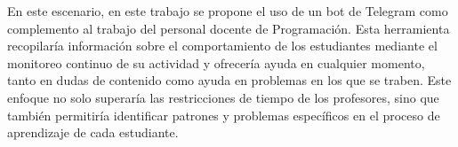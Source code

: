 \documentclass{article}
\begin{document}


En este escenario, en este trabajo se propone el uso de un bot de Telegram como complemento al trabajo del personal docente de Programación. Esta herramienta recopilaría información sobre el comportamiento de los estudiantes mediante el monitoreo continuo de su actividad y ofrecería ayuda en cualquier momento, tanto en dudas de contenido como ayuda en problemas en los que se traben. Este enfoque no solo superaría las restricciones de tiempo de los profesores, sino que también permitiría identificar patrones y problemas específicos en el proceso de aprendizaje de cada estudiante.
\end{document}
